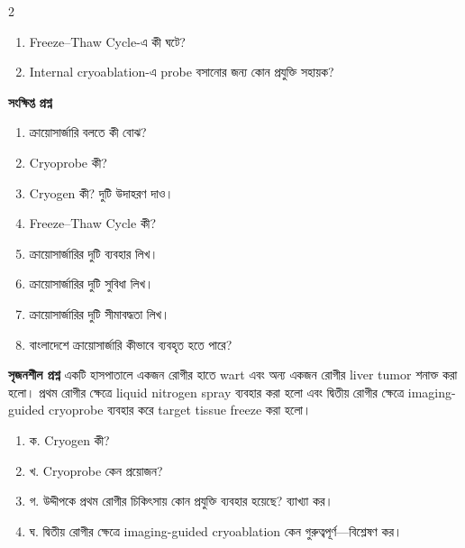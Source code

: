 \begin{practicebox}
\begin{multicols}{2}
\begin{enumerate}
\item \begin{minipage}[t]{\linewidth}Freeze--Thaw Cycle-এ কী ঘটে?\par {}\par\end{minipage}

\item \begin{minipage}[t]{\linewidth}Internal cryoablation-এ probe বসানোর জন্য কোন প্রযুক্তি সহায়ক?\par {}\par\end{minipage}
\end{enumerate}\end{multicols}

\textbf{সংক্ষিপ্ত প্রশ্ন}
\begin{enumerate}
\item ক্রায়োসার্জারি বলতে কী বোঝ?
\item Cryoprobe কী?
\item Cryogen কী? দুটি উদাহরণ দাও।
\item Freeze--Thaw Cycle কী?
\item ক্রায়োসার্জারির দুটি ব্যবহার লিখ।
\item ক্রায়োসার্জারির দুটি সুবিধা লিখ।
\item ক্রায়োসার্জারির দুটি সীমাবদ্ধতা লিখ।
\item বাংলাদেশে ক্রায়োসার্জারি কীভাবে ব্যবহৃত হতে পারে?
\end{enumerate}

\textbf{সৃজনশীল প্রশ্ন}
একটি হাসপাতালে একজন রোগীর হাতে wart এবং অন্য একজন রোগীর liver tumor শনাক্ত করা হলো। প্রথম রোগীর ক্ষেত্রে liquid nitrogen spray ব্যবহার করা হলো এবং দ্বিতীয় রোগীর ক্ষেত্রে imaging-guided cryoprobe ব্যবহার করে target tissue freeze করা হলো।

\begin{enumerate}
\item ক. Cryogen কী?
\item খ. Cryoprobe কেন প্রয়োজন?
\item গ. উদ্দীপকে প্রথম রোগীর চিকিৎসায় কোন প্রযুক্তি ব্যবহার হয়েছে? ব্যাখ্যা কর।
\item ঘ. দ্বিতীয় রোগীর ক্ষেত্রে imaging-guided cryoablation কেন গুরুত্বপূর্ণ—বিশ্লেষণ কর।
\end{enumerate}
\end{practicebox}

